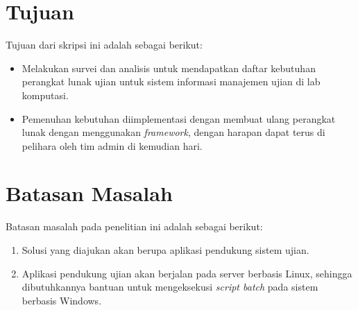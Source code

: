 \section{Tujuan}
\label{sec:tujuan}
Tujuan dari skripsi ini adalah sebagai berikut:
\begin{itemize}
    \item Melakukan survei dan analisis untuk mendapatkan daftar kebutuhan perangkat lunak ujian untuk sistem informasi manajemen ujian di lab komputasi.
    \item Pemenuhan kebutuhan diimplementasi dengan membuat ulang perangkat lunak dengan menggunakan \textit{framework}, dengan harapan dapat terus di pelihara oleh tim admin di kemudian hari.
\end{itemize}

\section{Batasan Masalah}
\label{sec:batasan}
Batasan masalah pada penelitian ini adalah sebagai berikut:
\begin{enumerate}
    \item Solusi yang diajukan akan berupa aplikasi pendukung sistem ujian.
  
    \item Aplikasi pendukung ujian akan berjalan pada server berbasis Linux, sehingga dibutuhkannya bantuan untuk mengeksekusi \textit{script batch} pada sistem berbasis Windows.
\end{enumerate}

